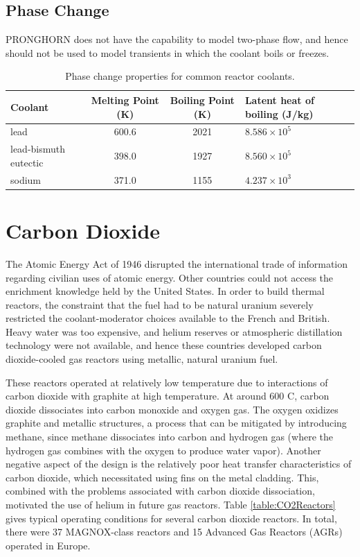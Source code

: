 \documentclass[10pt]{article}
\numberwithin{equation}{section} %
\begin{document}
\subsection{Phase Change}

PRONGHORN does not have the capability to model two-phase flow, and hence should not be used to model transients in which the coolant boils or freezes.

\begin{table}[H]
\caption{Phase change properties for common reactor coolants.}
\centering
\begin{tabular}{l c c l}
\hline\hline
Coolant & Melting Point (K) & Boiling Point (K) & Latent heat of boiling (J/kg)\\ [0.5ex]
\hline
lead \cite{LMproperties}				& 600.6	& 2021	& \(8.586\times10^5\)\\
lead-bismuth eutectic \cite{LMproperties}	& 398.0	& 1927	& \(8.560\times10^5\)\\
sodium \cite{LMproperties}			& 371.0 	& 1155 	& \(4.237\times 10^3\)\\
\hline
\end{tabular}
\end{table}

\section{Carbon Dioxide}

The Atomic Energy Act of 1946 disrupted the international trade of information regarding civilian uses of atomic energy. Other countries could not access the enrichment knowledge held by the United States. In order to build thermal reactors, the constraint that the fuel had to be natural uranium severely restricted the coolant-moderator choices available to the French and British. Heavy water was too expensive, and helium reserves or atmospheric distillation technology were not available, and hence these countries developed carbon dioxide-cooled gas reactors using metallic, natural uranium fuel.

These reactors operated at relatively low temperature due to interactions of carbon dioxide with graphite at high temperature. At around 600 \degree C, carbon dioxide dissociates into carbon monoxide and oxygen gas. The oxygen oxidizes graphite and metallic structures, a process that can be mitigated by introducing methane, since methane dissociates into carbon and hydrogen gas (where the hydrogen gas combines with the oxygen to produce water vapor). Another negative aspect of the design is the relatively poor heat transfer characteristics of carbon dioxide, which necessitated using fins on the metal cladding. This, combined with the problems associated with carbon dioxide dissociation, motivated the use of helium in future gas reactors. Table \ref{table:CO2Reactors} gives typical operating conditions for several carbon dioxide reactors. In total, there were 37 MAGNOX-class reactors and 15 Advanced Gas Reactors (AGRs) operated in Europe. 
\end{document}
